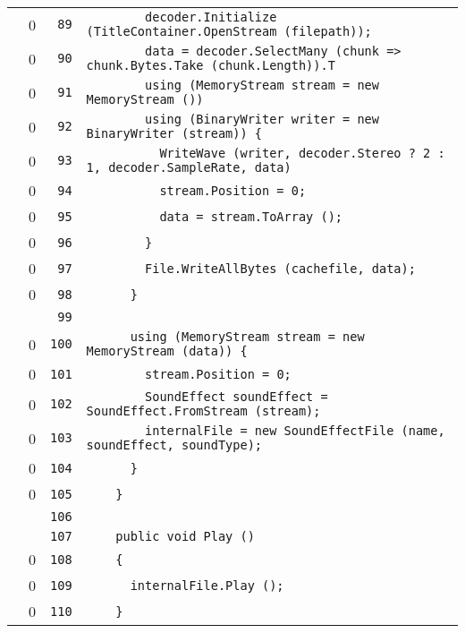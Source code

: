 \documentclass[a4paper,10pt]{article}
\begin{document}
\begin{longtable}[l]{lrrl}
\cellcolor{red} & 0 & \verb~89~ & \verb~        decoder.Initialize (TitleContainer.OpenStream (filepath));~\\
\cellcolor{red} & 0 & \verb~90~ & \verb~        data = decoder.SelectMany (chunk => chunk.Bytes.Take (chunk.Length)).T~\\
\cellcolor{red} & 0 & \verb~91~ & \verb~        using (MemoryStream stream = new MemoryStream ())~\\
\cellcolor{red} & 0 & \verb~92~ & \verb~        using (BinaryWriter writer = new BinaryWriter (stream)) {~\\
\cellcolor{red} & 0 & \verb~93~ & \verb~          WriteWave (writer, decoder.Stereo ? 2 : 1, decoder.SampleRate, data)~\\
\cellcolor{red} & 0 & \verb~94~ & \verb~          stream.Position = 0;~\\
\cellcolor{red} & 0 & \verb~95~ & \verb~          data = stream.ToArray ();~\\
\cellcolor{red} & 0 & \verb~96~ & \verb~        }~\\
\cellcolor{red} & 0 & \verb~97~ & \verb~        File.WriteAllBytes (cachefile, data);~\\
\cellcolor{red} & 0 & \verb~98~ & \verb~      }~\\
\cellcolor{gray} &  & \verb~99~ & \verb~~\\
\cellcolor{red} & 0 & \verb~100~ & \verb~      using (MemoryStream stream = new MemoryStream (data)) {~\\
\cellcolor{red} & 0 & \verb~101~ & \verb~        stream.Position = 0;~\\
\cellcolor{red} & 0 & \verb~102~ & \verb~        SoundEffect soundEffect = SoundEffect.FromStream (stream);~\\
\cellcolor{red} & 0 & \verb~103~ & \verb~        internalFile = new SoundEffectFile (name, soundEffect, soundType);~\\
\cellcolor{red} & 0 & \verb~104~ & \verb~      }~\\
\cellcolor{red} & 0 & \verb~105~ & \verb~    }~\\
\cellcolor{gray} &  & \verb~106~ & \verb~~\\
\cellcolor{gray} &  & \verb~107~ & \verb~    public void Play ()~\\
\cellcolor{red} & 0 & \verb~108~ & \verb~    {~\\
\cellcolor{red} & 0 & \verb~109~ & \verb~      internalFile.Play ();~\\
\cellcolor{red} & 0 & \verb~110~ & \verb~    }~\\

\end{longtable}
\end{document}

